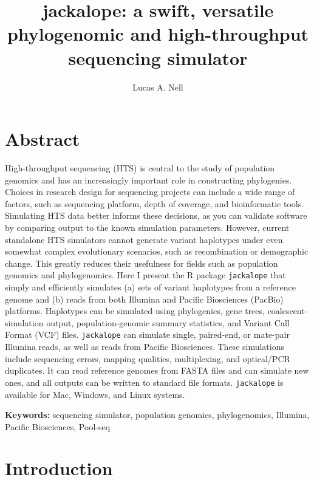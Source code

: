 \documentclass[12pt,]{article}
\title{
    jackalope: a swift, versatile phylogenomic and high-throughput sequencing simulator
            }
\author[1]{Lucas A. Nell}
\affil[1]{Department of Integrative Biology, University of Wisconsin--Madison}
\date{}
\makeatletter
\def\maketitle{{%
  \renewenvironment{tabular}[2][]
    {\begin{flushleft}}
    {\end{flushleft}}
  \AB@maketitle}}
\makeatother
\begin{document}
            \maketitle




\raggedright

\section*{Abstract}

High-throughput sequencing (HTS) is central to the study of population genomics
and has an increasingly important role in constructing phylogenies.
Choices in research design for sequencing projects can include
a wide range of factors, such as sequencing platform, depth of coverage, and
bioinformatic tools.
Simulating HTS data better informs these decisions, as you can validate software by
comparing output to the known simulation parameters.
However, current standalone HTS simulators cannot generate variant haplotypes under
even somewhat complex evolutionary scenarios, such as recombination or demographic change.
This greatly reduces their usefulness
for fields such as population genomics and phylogenomics.
Here I present the R package \texttt{jackalope} that simply and efficiently simulates
(a) sets of variant haplotypes from a reference genome and
(b) reads from both Illumina and Pacific Biosciences (PacBio) platforms.
Haplotypes can be simulated using phylogenies, gene trees,
coalescent-simulation output, population-genomic summary statistics,
and Variant Call Format (VCF) files.
\texttt{jackalope} can simulate single, paired-end, or mate-pair Illumina reads,
as well as reads from Pacific Biosciences.
These simulations include sequencing errors, mapping qualities, multiplexing,
and optical/PCR duplicates.
It can read reference genomes from FASTA files and can simulate new ones,
and all outputs can be written to standard file formats.
\texttt{jackalope} is available for Mac, Windows, and Linux systems.

\textbf{Keywords:} sequencing simulator, population genomics, phylogenomics,
Illumina, Pacific Biosciences, Pool-seq

\hypertarget{introduction}{%
\section{Introduction}\label{introduction}}
\end{document}
